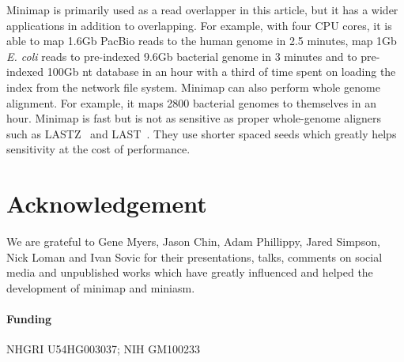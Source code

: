 \documentclass{bioinfo}
\begin{document}
Minimap is primarily used as a read overlapper in this article, but it has a
wider applications in addition to overlapping.  For example, with four CPU
cores, it is able to map 1.6Gb PacBio reads to the human genome in 2.5 minutes,
map 1Gb {\it E. coli} reads to pre-indexed 9.6Gb bacterial genome in 3 minutes
and to pre-indexed 100Gb nt database in an hour with a third of time spent on
loading the index from the network file system. Minimap can also perform whole
genome alignment. For example, it maps 2800 bacterial genomes to themselves in
an hour. Minimap is fast but is not as sensitive as proper whole-genome
aligners such as LASTZ~\citep{harris:2007aa} and LAST~\citep{Kiebasa:2011aa}.
They use shorter spaced seeds which greatly helps sensitivity at the cost of
performance.

\section*{Acknowledgement}
We are grateful to Gene Myers, Jason Chin, Adam Phillippy, Jared Simpson, Nick
Loman and Ivan Sovic for their presentations, talks, comments on social media
and unpublished works which have greatly influenced and helped the development
of minimap and miniasm.

\paragraph{Funding\textcolon} NHGRI U54HG003037; NIH GM100233


\end{document}
